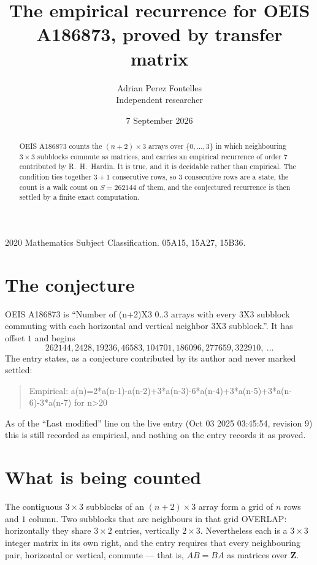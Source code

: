 \documentclass[11pt,a4paper]{article}
\title{The empirical recurrence for OEIS A186873, proved by transfer matrix}
\author{Adrian Perez Fontelles\\ \small Independent researcher}
\date{7 September 2026}
\theoremstyle{plain}
\theoremstyle{definition}
\begin{document}
\maketitle

\begin{abstract}
OEIS A186873 counts the $(n+2)\times3$ arrays over $\{0,\dots,3\}$ in which
neighbouring $3\times3$ subblocks commute as matrices, and carries an empirical recurrence
of order $7$ contributed by R.~H.~Hardin. It is true, and it is decidable rather than
empirical. The condition ties together $3+1$ consecutive rows, so $3$ consecutive rows are
a state, the count is a walk count on $S=262144$ of them, and the conjectured recurrence is then
settled by a finite exact computation.
\end{abstract}

\noindent\small 2020 Mathematics Subject Classification. 05A15, 15A27, 15B36.\normalsize

\section{The conjecture}

OEIS A186873 is ``Number of (n+2)X3 0..3 arrays with every 3X3 subblock commuting with each horizontal and vertical neighbor 3X3 subblock.''. It has offset $1$ and begins
\[
262144, 2428, 19236, 46583, 104701, 186096, 277659, 322910,\ \dots
\]
The entry states, as a conjecture contributed by its author and never marked settled:
\begin{quote}
Empirical: a(n)=2*a(n-1)-a(n-2)+3*a(n-3)-6*a(n-4)+3*a(n-5)+3*a(n-6)-3*a(n-7) for n>20
\end{quote}
As of the ``Last modified'' line on the live entry (Oct 03 2025 03:45:54, revision 9) this is still
recorded as empirical, and nothing on the entry records it as proved.

\section{What is being counted}

The contiguous $3\times3$ subblocks of an $(n+2)\times3$ array form a grid of $n$
rows and $1$ column. Two subblocks that are neighbours in that
grid OVERLAP: horizontally they share $3\times2$ entries, vertically
$2\times3$. Nevertheless each is a $3\times3$ integer matrix in its own right, and
the entry requires that every neighbouring pair, horizontal or vertical, commute --- that is,
$AB=BA$ as matrices over $\mathbf{Z}$.
\end{document}
